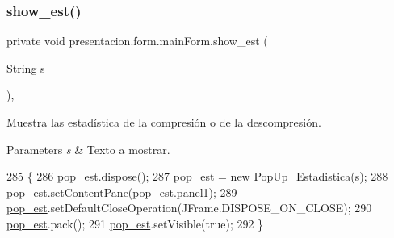 \subsubsection{\texorpdfstring{show\+\_\+est()}{show\_est()}}
{\footnotesize\ttfamily private void presentacion.\+form.\+main\+Form.\+show\+\_\+est (\begin{DoxyParamCaption}\item[{String}]{s }\end{DoxyParamCaption})\hspace{0.3cm}{\ttfamily [inline]}, {\ttfamily [private]}}



Muestra las estadística de la compresión o de la descompresión. 


\begin{DoxyParams}{Parameters}
{\em s} & Texto a mostrar. \\
\hline
\end{DoxyParams}

\begin{DoxyCode}
285                                     \{
286         \hyperlink{classpresentacion_1_1form_1_1mainForm_ae04f75ed65fa9e0347f645e877f6eb95}{pop\_est}.dispose();
287         \hyperlink{classpresentacion_1_1form_1_1mainForm_ae04f75ed65fa9e0347f645e877f6eb95}{pop\_est} = \textcolor{keyword}{new} PopUp\_Estadistica(s);
288         \hyperlink{classpresentacion_1_1form_1_1mainForm_ae04f75ed65fa9e0347f645e877f6eb95}{pop\_est}.setContentPane(\hyperlink{classpresentacion_1_1form_1_1mainForm_ae04f75ed65fa9e0347f645e877f6eb95}{pop\_est}.\hyperlink{classpresentacion_1_1form_1_1PopUp__Estadistica_ac276266d42b873f89883dd3a869feadf}{panel1});
289         \hyperlink{classpresentacion_1_1form_1_1mainForm_ae04f75ed65fa9e0347f645e877f6eb95}{pop\_est}.setDefaultCloseOperation(JFrame.DISPOSE\_ON\_CLOSE);
290         \hyperlink{classpresentacion_1_1form_1_1mainForm_ae04f75ed65fa9e0347f645e877f6eb95}{pop\_est}.pack();
291         \hyperlink{classpresentacion_1_1form_1_1mainForm_ae04f75ed65fa9e0347f645e877f6eb95}{pop\_est}.setVisible(\textcolor{keyword}{true});
292     \}
\end{DoxyCode}
\mbox{\label{classpresentacion_1_1form_1_1mainForm_aa71c48a8ef6eb2b3913dd665e5439538}} 
